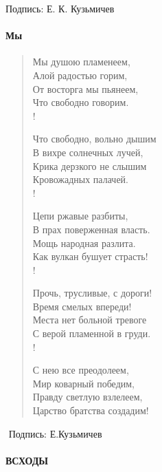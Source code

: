 \documentclass[]{memoir}
\begin{document}
Подпись: Е. К. Кузьмичев
          



\paragraph{Мы}

\begin{verse}
Мы душою пламенеем,\\
Алой радостью горим,\\
От восторга мы пьянеем,\\
Что свободно говорим.\\!

    Что свободно, вольно дышим\\
    В вихре солнечных лучей,\\
    Крика дерзкого не слышим\\
    Кровожадных палачей.\\!

Цепи ржавые разбиты,\\
В прах поверженная власть.\\
Мощь народная разлита.\\
Как вулкан бушует страсть!\\!

    Прочь, трусливые, с дороги!\\
    Время смелых впереди!\\
    Места нет больной тревоге\\
    С верой пламенной в груди.\\!

С нею все преодолеем,\\
Мир коварный победим,\\
Правду светлую взлелеем,\\
Царство братства создадим!
\end{verse}
﻿                           
Подпись: Е.Кузьмичев




\paragraph{ВСХОДЫ}
\end{document}
